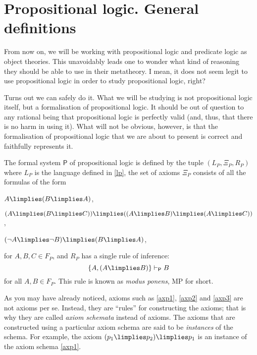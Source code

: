 
\section{Propositional logic. General definitions}

\begin{para}
From now on, we will be working with propositional logic and predicate logic as object theories.
This unavoidably leads one to wonder what kind of reasoning they should be able to use in their metatheory.
I mean, it does not seem legit to use propositional logic in order to study propositional logic, right?

Turns out we can safely do it.
What we will be studying is not propositional logic itself, but a formalisation of propositional logic.
It should be out of question to any rational being that propositional logic is perfectly valid (and, thus, that there is no harm in using it).
What will not be obvious, however, is that the formalisation of propositional logic that we are about to present is correct and faithfully represents it.
\end{para}

\begin{definition}
The formal system $\mathsf{P}$ of propositional logic is defined by the tuple $(L_P,\Xi_P,R_P)$ where $L_P$ is the language defined in \ref{lp}, the set of axioms $\Xi_P$ consists of all the formulas of the form
\begin{axioms}[P]
\item \label{axp1} $A\limplies (B \limplies A)$,
\item \label{axp2} $(A\limplies(B\limplies C))\limplies ((A\limplies B)\limplies (A\limplies C))$,
\item \label{axp3} $(\lnot A \limplies \lnot B) \limplies (B\limplies A)$,
\end{axioms}
for $A,B,C\in F_P$, and $R_P$ has a single rule of inference:
\[ \{A,(A\limplies B)\} \vdash_{\mathsf{P}} B\]
for all $A,B\in F_P$. This rule is known as \emph{modus ponens}, MP for short.
\end{definition}

\begin{para}
As you may have already noticed, axioms such as \ref{axp1}, \ref{axp2} and \ref{axp3} are not axioms per se. Instead, they are ``rules'' for constructing the axioms; that is why they are called \emph{axiom schemata} instead of axioms. The axioms that are constructed using a particular axiom schema are said to be \emph{instances} of the schema. For example, the axiom $(p_1\limplies p_2)\limplies p_1$ is an instance of the axiom schema \ref{axp1}.
\end{para}

